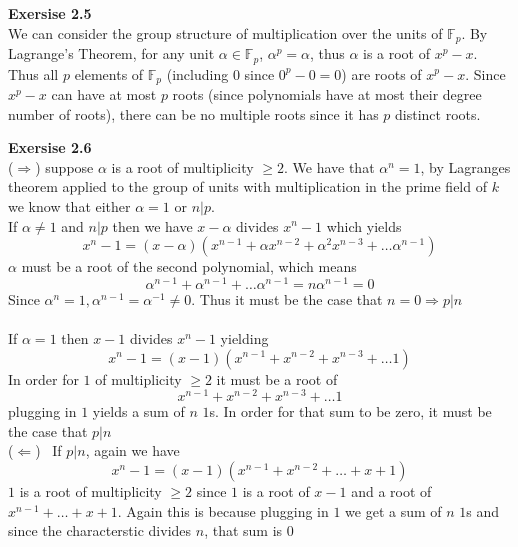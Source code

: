 \documentclass[12pt]{article}
\newenvironment{ques}[1]{\textbf{Exersise #1}\vspace{1 mm}\\ }{\bigskip}
\theoremstyle{definition}
\newcommand{\F}{\mathbb F}
\renewcommand{\a}{\alpha}
\begin{document}
\begin{ques}{2.5}
	We can consider the group structure of multiplication over the units of
	$\F_p$. By Lagrange's Theorem, for any unit $\a \in \F_p$, $\a^p = \a$,
	thus $\a$ is a root of $x^p - x$. Thus all $p$ elements of $\F_p$
	(including $0$ since $0^p - 0 = 0$) are roots of $x^p - x$. Since $x^p - x$
	can have at most $p$ roots (since polynomials have at most their degree
	number of roots), there can be no multiple roots since it has $p$ distinct
	roots.
\end{ques}

\begin{ques}{2.6}
	($\Rightarrow$) suppose $\a$ is a root of multiplicity $\geq 2$. We have
	that $\a^n = 1$, by Lagranges theorem applied to the group of units with
	multiplication in the prime field of $k$ we know that either $\a = 1$ or $n|p$.\\
	If $\a \neq 1$ and $n|p$ then we have $x-\a$ divides $x^n - 1$ which yields
	$$x^n - 1 = (x - \a)(x^{n-1} + \a x^{n-2} + \a^2x^{n-3} + \dots \a^{n-1})$$
	$\a$ must be a root of the second polynomial, which means
	$$\a^{n-1} + \a^{n-1} + \dots \a^{n-1} = n\a^{n-1} = 0$$
	Since $\a^n = 1, \a^{n-1} = \a^{-1} \neq 0$. Thus it must be the case that
	$n = 0 \Rightarrow p|n$\\
	\\
	If $\a = 1$ then $x - 1$ divides $x^n - 1$ yielding
	$$x^n - 1 = (x - 1)(x^{n-1} + x^{n-2} + x^{n-3} + \dots 1)$$
	In order for $1$ of multiplicity $\geq 2$ it must be a root of 
	$$x^{n-1} + x^{n-2} + x^{n-3} + \dots 1$$
	plugging in $1$ yields a sum of $n$ $1$s. In order for that sum to be zero,
	it must be the case that $p|n$
	\\
	($\Leftarrow$) \ If $p | n$, again we have
	$$x^n - 1 = (x - 1)(x^{n-1} + x^{n-2} + \dots + x + 1)$$
	$1$ is a root of multiplicity $\geq 2$ since $1$ is a root of $x - 1$ and
	a root of $x^{n-1} + \dots + x + 1$. Again this is because plugging in $1$ we get
	a sum of $n$ $1$s and since the characterstic divides $n$, that sum is $0$
\end{ques}
\end{document}
